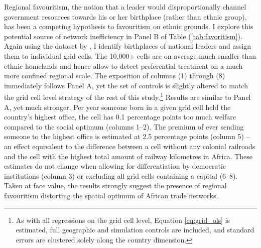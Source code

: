 \documentclass[11pt, oneside]{article}   	%
\let\oldref\ref
\renewcommand{\ref}[1]{(\oldref{#1})}
\begin{document}
Regional favouritism, the notion that a leader would disproportionally channel government resources towards his or her birthplace (rather than ethnic group), has been a competing hypothesis to favouritism on ethnic grounds. I explore this potential source of network inefficiency in Panel B of Table \ref{tab:favoritism}. Again using the dataset by \cite{Dreher_AiddemandAfrican_2016}, I identify birthplaces of national leaders and assign them to individual grid cells. The 10,000+ cells are on average much smaller than ethnic homelands and hence allow to detect preferential treatment on a much more confined regional scale. The exposition of columns (1) through (8) immediately follows Panel A, yet the set of controls is slightly altered to match the grid cell level strategy of the rest of this study.\footnote{As with all regressions on the grid cell level, Equation \eqref{eq:grid_ols} is estimated, full geographic and simulation controls are included, and standard errors are clustered solely along the country dimension.} Results are similar to Panel A, yet much stronger. Per year someone born in a given grid cell held the country's highest office, the cell has 0.1 percentage points too much welfare compared to the social optimum (columns 1--2). The premium of ever sending someone to the highest office is estimated at 2.5 percentage points (column 5) -- an effect equivalent to the difference between a cell without any colonial railroads and the cell with the highest total amount of railway kilometres in Africa. These estimates do not change when allowing for differentiation by democratic institutions (column 3) or excluding all grid cells containing a capital (6--8). Taken at face value, the results strongly suggest the presence of regional favouritism distorting the spatial optimum of African trade networks.
\end{document}
